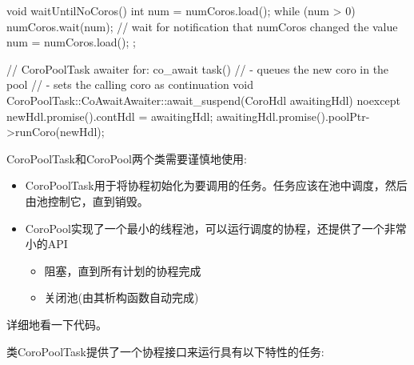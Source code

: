 \begin{cpp}
{	void waitUntilNoCoros() {
		int num = numCoros.load();
		while (num > 0) {
		numCoros.wait(num); // wait for notification that numCoros changed the value
		num = numCoros.load();
		}
	}
};

// CoroPoolTask awaiter for: co_await task()
// - queues the new coro in the pool
// - sets the calling coro as continuation
void CoroPoolTask::CoAwaitAwaiter::await_suspend(CoroHdl awaitingHdl) noexcept
{
	newHdl.promise().contHdl = awaitingHdl;
	awaitingHdl.promise().poolPtr->runCoro(newHdl);
}
\end{cpp}

CoroPoolTask和CoroPool两个类需要谨慎地使用:

\begin{itemize}
\item
CoroPoolTask用于将协程初始化为要调用的任务。任务应该在池中调度，然后由池控制它，直到销毁。

\item
CoroPool实现了一个最小的线程池，可以运行调度的协程，还提供了一个非常小的API
\begin{itemize}
\item
阻塞，直到所有计划的协程完成

\item
关闭池(由其析构函数自动完成)
\end{itemize}
\end{itemize}

详细地看一下代码。


类CoroPoolTask提供了一个协程接口来运行具有以下特性的任务:

